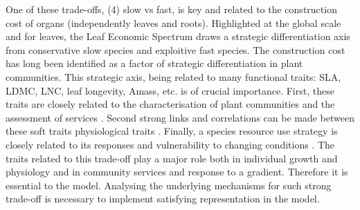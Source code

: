 One of these trade-offs, (4) slow vs fast, is key and related to the construction cost of organs (independently leaves and roots). Highlighted at the global scale and for leaves, the Leaf Economic Spectrum \parencite{wright_worldwide_2004} draws a strategic differentiation axis from conservative slow species and exploitive fast species. The construction cost has long been identified as a factor of strategic differentiation in plant communities\parencite{westoby_leaf-height-seed_1998}. This strategic axis, being related to many functional traits: SLA, LDMC, LNC, leaf longevity, Amass, etc.\parencite{wright_worldwide_2004} is of crucial importance. First, these traits are closely related to the characterisation of plant communities and the assessment of services \parencite{grime_benefits_1998}. Second strong links and correlations can be made between these soft traits physiological traits \parencite{craine_functional_2002, reich_variation_2003, wright_worldwide_2004}. Finally, a species resource use strategy is closely related to its responses and vulnerability to changing conditions \parencite{poorter_causes_2009, dwyer_specific_2014, deleglise_drought-induced_2015}. The traits related to this trade-off play a major role both in individual growth and physiology and in community services and response to a gradient. Therefore it is essential to the model. Analysing the underlying mechanisms for such strong trade-off is necessary to implement satisfying representation in the model.\\


